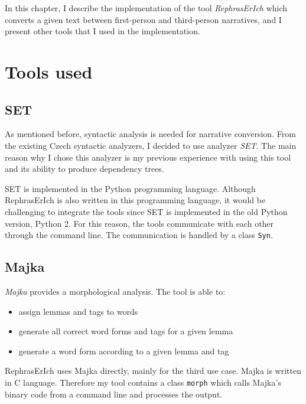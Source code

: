 In this chapter, I describe the implementation of the tool \emph{RephrasErIch} which converts a given text between first-person and third-person narratives, and I present other tools that I used in the implementation.

\section{Tools used} \label{sec:external-tools}

\subsection{SET}

As mentioned before, syntactic analysis is needed for narrative conversion. From the existing Czech syntactic analyzers, I decided to use analyzer \emph{SET}. The main reason why I chose this analyzer is my previous experience with using this tool and its ability to produce dependency trees.

SET is implemented in the Python programming language. Although RephrasErIch is also written in this programming language, it would be challenging to integrate the tools since SET is implemented in the old Python version, Python 2. For this reason, the tools communicate with each other through the command line. The communication is handled by a class \texttt{Syn}.

\subsection{Majka}

\emph{Majka} \cite{majka} provides a morphological analysis. The tool is able to:
\begin{itemize}
	\item assign lemmas and tags to words
	\item generate all correct word forms and tags for a given lemma
	\item generate a word form according to a given lemma and tag
\end{itemize}

RephrasErIch uses Majka directly, mainly for the third use case. Majka is written in C language. Therefore my tool contains a class \texttt{morph} which calls Majka's binary code from a command line and processes the output.

